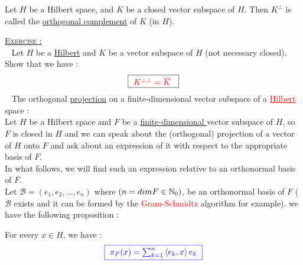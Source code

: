 \begin{definition}[]
Let $H $ be a Hilbert space, and $K $ be a closed
vector subspace of $H $. Then $K^{\bot } $ is called 
the \underline{orthogonal complement} of $K $ (in $H $).
\end{definition}
\divider
\underline{
  \large
\textsc{Exercise :} 
}
\warning
\normalfont
\\
\lefthand ~
Let $H $ be a \underline{Hilbert} and $K $ be 
a vector subspace of $H $ (not necessary closed). Show that we have : 
\[
  \fbox{
    \textcolor{red}{
     $K^{\bot  \bot } = \overline{K}$ 
    }
  }
\]
\divider
\lefthand ~ The orthogonal \underline{projection} 
on a finite-dimensional vector subspace of a \textcolor{red}{
\underline{Hilbert}} space : 
\\
Let $H $ be a Hilbert space and $F $ be a 
\underline{
finite-dimensional
} vector subspace of $H $, so $F $ is closed in $H $ and 
we can speak about the (orthogonal) projection of a vector 
of $H $ onto $F $ and ask about an expression of it with respect
to the appropriate basis of $F $. \\
In what follows, we will find such an expression relative to 
an orthonormal basis of $F $.\\
Let $\mathcal{B} = (e_1, e_2, \hdots , e_{n})$ 
where $(n = dimF \in  \mathbb{N}_0)$, be an orthonormal basis 
of $F$ ( $\mathcal{B}  $ exists and it can be formed 
by the \textcolor{red}{Gram-Schmidtz} algorithm for example). 
we have the following proposition : 
\begin{theorem}[]
For every $x \in  H $, we have : 
  \[
      \textcolor{blue}{
    \fbox{
        $\pi _{F}(x) = 
        \sum_{k=1}^{n} 
        \left\langle e_{k}, x \right\rangle e_{k}$ 
      }
    }
  \]
\end{theorem}
